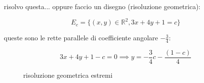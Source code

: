 \documentclass[../appunti-analisi.tex]{subfiles}
\begin{document}
risolvo questa... oppure faccio un disegno (risoluzione geometrica):

\[
    E_c = \{(x,y) \in \mathbb{R}^{2}, 3x+4y + 1 = c\}
\]

queste sono le rette parallele di coefficiente angolare $-\frac{3}{4}$:

\[
    3x + 4y +1 -c = 0 \implies y = -\frac{3}{4}c - \frac{(1-c)}{4}
\]

\begin{figure}[ht]
    \centering
    \caption{risoluzione geometrica estremi}
    \label{fig:risoluzione-geometrica-estremi}
\end{figure}
\end{document}
